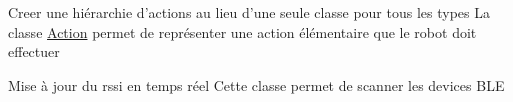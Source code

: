 
\begin{DoxyRefList}
\item[\label{todo__todo000001}%
\hypertarget{todo__todo000001}{}%
Class \hyperlink{classAction}{Action} ]Creer une hiérarchie d'actions au lieu d'une seule classe pour tous les types La classe \hyperlink{classAction}{Action} permet de représenter une action élémentaire que le robot doit effectuer  
\item[\label{todo__todo000002}%
\hypertarget{todo__todo000002}{}%
Class \hyperlink{classDevice}{Device} ]Mise à jour du rssi en temps réel Cette classe permet de scanner les devices B\-L\-E 
\end{DoxyRefList}